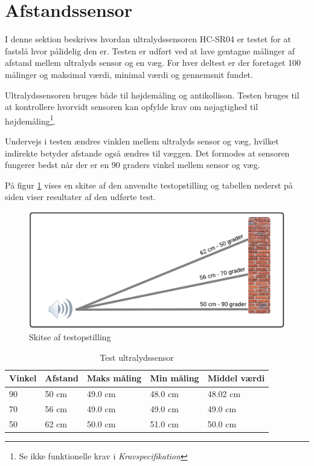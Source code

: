 \section{Afstandssensor}

I denne sektion beskrives hvordan ultralydssensoren HC-SR04 er testet for at fastslå hvor pålidelig den er. Testen er udført ved at lave gentagne målinger af afstand mellem ultralyds sensor og en væg. For hver deltest er der foretaget 100 målinger og maksimal værdi, minimal værdi og gennemsnit fundet. 

Ultralydssensoren bruges både til højdemåling og antikollison. Testen bruges til at kontrollere hvorvidt sensoren kan opfylde krav om nøjagtighed til højdemåling\footnote{Se ikke funktionelle krav i \textit{Kravspecifikation}}. 

Undervejs i testen ændres vinklen mellem ultralyds sensor og væg, hvilket indirekte betyder afstande også ændres til væggen. Det formodes at sensoren fungerer bedst når der er en 90 graders vinkel mellem sensor og væg. 

På figur \ref{fig:ultra_testopstilling} vises en skitse af den anvendte testopstilling og tabellen nederst på siden viser resultater af den udførte test.

\begin{figure}[H]
\centering
\includegraphics[width=1\textwidth]{Billeder/Test/ultrasound.png}
\caption{Skitse af testopstilling}
\label{fig:ultra_testopstilling}
\end{figure}

\vspace{0.5cm}

\begin{table}[H]
\begin{tabular}{| p{2.5cm}| p{2.5cm}| p{2.5cm}| p{2.5cm}| p{2.5cm}|}
\hline
\textbf{Vinkel} & \textbf{Afstand} & \textbf{Maks måling} & \textbf{Min måling}  & \textbf{Middel værdi} \\ \hline
90 & 50 cm & 49.0 cm & 48.0 cm  & 48.02 cm \\ \hline
70 & 56 cm & 49.0 cm & 49.0 cm  & 49.0 cm \\ \hline
50 & 62 cm & 50.0 cm & 51.0 cm  & 50.0 cm \\ \hline

\end{tabular}
\caption{Test ultralydssensor}
\label{tab:Ultralyds_test}
\end{table}


